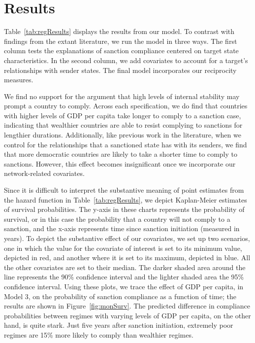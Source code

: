 \section*{Results}
\label{Results} 

Table~\ref{tab:regResults} displays the results from our model. To contrast with findings from the extant literature, we run the model in three ways. The first column tests the explanations of sanction compliance centered on target state characteristics. In the second column, we add covariates to account for a target's relationships with sender states. The final model incorporates our reciprocity measures. 



We find no support for the argument that high levels of internal stability may prompt a country to comply. Across each specification, we do find that countries with higher levels of GDP per capita take longer to comply to a sanction case, indicating that wealthier countries are able to resist complying to sanctions for lengthier durations. Additionally, like previous work in the literature, when we control for the relationships that a sanctioned state has with its senders, we find that more democratic countries are likely to take a shorter time to comply to sanctions. However, this effect becomes insignificant once we incorporate our network-related covariates. 

Since it is difficult to interpret the substantive meaning of point estimates from the hazard function in Table~\ref{tab:regResults}, we depict Kaplan-Meier estimates of survival probabilities. The y-axis in these charts represents the probability of survival, or in this case the probability that a country will not comply to a sanction, and the x-axis represents time since sanction initiation (measured in years). To depict the substantive effect of our covariates, we set up two scenarios, one in which the value for the covariate of interest is set to its minimum value, depicted in red, and another where it is set to its maximum, depicted in blue. All the other covariates are set to their median. The darker shaded area around the line represents the 90\% confidence interval and the lighter shaded area the 95\% confidence interval. Using these plots, we trace the effect of GDP per capita, in Model 3, on the probability of sanction compliance as a function of time; the results are shown in Figure~\ref{fig:monSurv}. The predicted difference in compliance probabilities between regimes with varying levels of GDP per capita, on the other hand, is quite stark. Just five years after sanction initiation, extremely poor regimes are 15\% more likely to comply than wealthier regimes. 

